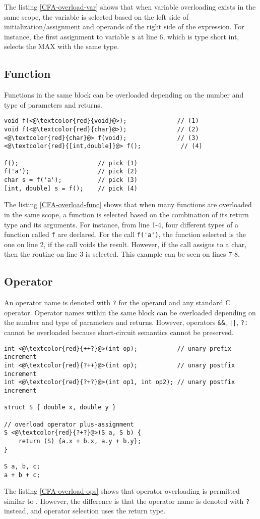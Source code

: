 The listing \ref{CFA-overload-var} shows that when variable overloading exists
in the same scope, the variable is selected based on the left side of
initialization/assignment and operands of the right side of the expression. For
instance, the first assignment to variable \verb|s| at line 6, which is type short int,
selects the MAX with the same type.

\subsection{Function}
Functions in the same block can be overloaded depending on the number and type of
parameters and returns.

\begin{lstlisting}[style=C++nokeyword, caption={Overloading routines in \CFA},
label={CFA-overload-func}]
void f(<@\textcolor{red}{void}@>);              // (1)
void f(<@\textcolor{red}{char}@>);              // (2)
<@\textcolor{red}{char}@> f(void);              // (3)
<@\textcolor{red}{[int,double]}@> f();           // (4)

f();                      // pick (1)
f('a');                   // pick (2)
char s = f('a');          // pick (3)
[int, double] s = f();    // pick (4)
\end{lstlisting}

The listing \ref{CFA-overload-func} shows that when many functions are overloaded in
the same scope, a function is selected based on the combination of its return type and its
arguments. For instance, from line 1-4, four different types of a function called
\verb|f| are declared. For the call \verb|f('a')|, the function selected is the
one on line 2, if the call voids the result. However, if the call assigns to a
char, then the routine on line 3 is selected. This example can be seen on lines
7-8.

\subsection{Operator}
An operator name is denoted with \verb|?| for the operand and any standard C
operator. Operator names within the same block can be overloaded depending on
the number and type of parameters and returns. However, operators \verb|&&|,
\verb-||-, \verb|?:| cannot be overloaded because short-circuit semantics
cannot be preserved.


\begin{lstlisting}[style=C++nokeyword, caption={Overloading operators in \CFA},
label={CFA-overload-ops}]
int <@\textcolor{red}{++?}@>(int op);           // unary prefix increment
int <@\textcolor{red}{?++}@>(int op);           // unary postfix increment
int <@\textcolor{red}{?+?}@>(int op1, int op2); // unary postfix increment

struct S { double x, double y }

// overload operator plus-assignment
S <@\textcolor{red}{?+?}@>(S a, S b) {
    return (S) {a.x + b.x, a.y + b.y};
}

S a, b, c;
a + b + c;
\end{lstlisting}

The listing \ref{CFA-overload-ops} shows that operator overloading is permitted
similar to \CC. However, the difference is that the operator name is
denoted with \verb|?| instead, and operator selection uses the return type.
